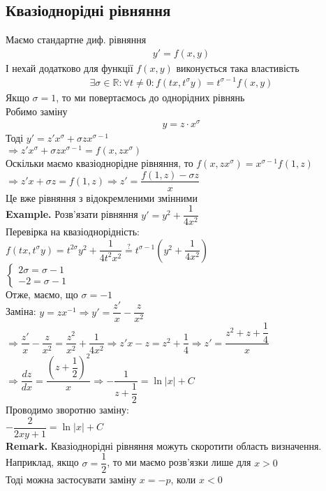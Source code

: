 \documentclass[a4paper, 14pt]{extarticle}
\def\bigline{\vspace{5mm}\\}
\begin{document}
\subsection{Квазіоднорідні рівняння}
Маємо стандартне диф. рівняння
\begin{align*}
y' = f(x,y)
\end{align*}
І нехай додатково для функції $f(x,y)$ виконується така властивість
\begin{align*}
\exists \sigma \in \mathbb{R}: \forall t \neq 0: f(tx, t^\sigma y) = t^{\sigma - 1} f(x,y)
\end{align*}
Якщо $\sigma = 1$, то ми повертаємось до однорідних рівнянь\\
Робимо заміну
\begin{align*}
y = z \cdot x^\sigma
\end{align*}
Тоді $y' = z' x^\sigma + \sigma z x^{\sigma - 1}$\\
$\Rightarrow z' x^\sigma + \sigma z x^{\sigma - 1} =  f(x, zx^\sigma)$\\
Оскільки маємо квазіоднорідне рівняння, то $f(x,zx^\sigma) = x^{\sigma - 1} f(1,z)$\\
$\Rightarrow z'x + \sigma z = f(1,z) \Rightarrow z' = \dfrac{f(1,z) - \sigma z}{x}$\\
Це вже рівняння з відокремленими змінними
\bigline
\textbf{Example.} Розв'язати рівняння $y' = y^2 + \dfrac{1}{4x^2}$\\
Перевірка на квазіоднорідність:\\
$f(tx, t^\sigma y) = t^{2 \sigma} y^2 + \dfrac{1}{4t^2 x^2} \overset{?}{=} t^{\sigma -1} \left(y^2 + \dfrac{1}{4x^2} \right)$\\
$\begin{cases}
2\sigma = \sigma - 1 \\
-2 = \sigma - 1
\end{cases}
$\\
Отже, маємо, що $\sigma = -1$\\
Заміна: $y = zx^{-1} \Rightarrow y' = \dfrac{z'}{x} - \dfrac{z}{x^2}$\\
$\Rightarrow \dfrac{z'}{x} - \dfrac{z}{x^2} = \dfrac{z^2}{x^2} + \dfrac{1}{4x^2}
\Rightarrow z'x - z = z^2 + \dfrac{1}{4} \Rightarrow z' = \dfrac{z^2+z+\dfrac{1}{4}}{x}$\\
$\Rightarrow \dfrac{dz}{dx} = \dfrac{\left( z+\dfrac{1}{2} \right)^2}{x} \Rightarrow -\dfrac{1}{z + \dfrac{1}{2}} = \ln |x| + C$\\
Проводимо зворотню заміну:\\
$-\dfrac{2}{2xy+1} = \ln |x| + C$
\bigline
\textbf{Remark.} Квазіоднорідні рівняння можуть скоротити область визначення. Наприклад, якщо $\sigma = \dfrac{1}{2}$, то ми маємо розв'язки лише для $x > 0$\\
Тоді можна застосувати заміну $x = -p$, коли $x < 0$
\bigline
\end{document}
